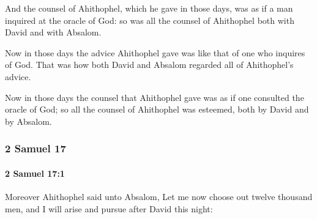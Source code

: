 			\begin{versebox}
					\item[BHS] 
					\item[ASV] And the counsel of Ahithophel, which he gave in those days, was as if a man inquired at the oracle of God: so was all the counsel of Ahithophel both with David and with Absalom.
					\item[NIV] Now in those days the advice Ahithophel gave was like that of one who inquires of God. That was how both David and Absalom regarded all of Ahithophel’s advice.
					\item[NRSV] Now in those days the counsel that Ahithophel gave was as if one consulted the oracle of God; so all the counsel of Ahithophel was esteemed, both by David and by Absalom.
			\end{versebox}
	\subsubsection{2 Samuel 17} %
		\label{2SAMUEL-17}

		\paragraph{2 Samuel 17:1} %
			\label{2SAMUEL-17-1}

			Moreover Ahithophel said unto Absalom, Let me now choose out twelve thousand men, and I will arise and pursue after David this night:

